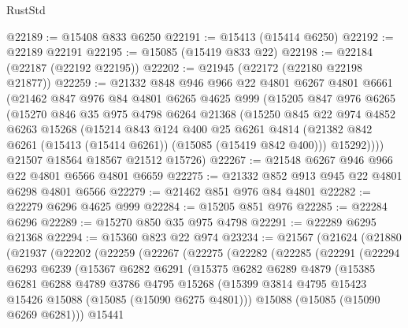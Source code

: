 \begin{lexlean}{RustStd}
\begin{coremodule}
@22189 := @15408 @833 @6250
@22191 := @15413 (@15414 @6250)
@22192 := @22189 @22191
@22195 := @15085 (@15419 @833 @22)
@22198 := @22184 (@22187 (@22192 @22195))
@22202 := @21945 (@22172 (@22180 @22198 @21877))
@22259 := @21332
    @848
    @946
    @966
    @22
    @4801
    @6267
    @4801
    @6661
    (@21462
      @847
      @976
      @84
      @4801
      @6265
      @4625
      @999
      (@15205
        @847
        @976
        @6265
        (@15270
          @846
          @35
          @975
          @4798
          @6264
          @21368
          (@15250
            @845
            @22
            @974
            @4852
            @6263
            @15268
            (@15214
              @843
              @124
              @400
              @25
              @6261
              @4814
              (@21382 @842 @6261 (@15413 (@15414 @6261)) (@15085 (@15419 @842 @400)))
              @15292))))
      @21507
      @18564
      @18567
      @21512
      @15726)
@22267 := @21548 @6267 @946 @966 @22 @4801 @6566 @4801 @6659
@22275 := @21332 @852 @913 @945 @22 @4801 @6298 @4801 @6566
@22279 := @21462 @851 @976 @84 @4801
@22282 := @22279 @6296 @4625 @999
@22284 := @15205 @851 @976
@22285 := @22284 @6296
@22289 := @15270 @850 @35 @975 @4798
@22291 := @22289 @6295 @21368
@22294 := @15360 @823 @22 @974
@23234 := @21567
    (@21624
      (@21880
        (@21937
          (@22202
            (@22259
              (@22267
                (@22275
                  (@22282
                    (@22285
                      (@22291
                        (@22294
                          @6293
                          @6239
                          (@15367
                            @6282
                            @6291
                            (@15375
                              @6282
                              @6289
                              @4879
                              (@15385
                                @6281
                                @6288
                                @4789
                                @3786
                                @4795
                                @15268
                                (@15399
                                  @3814
                                  @4795
                                  @15423
                                  @15426
                                  @15088
                                  (@15085 (@15090 @6275 @4801)))
                                @15088
                                (@15085 (@15090 @6269 @6281)))
                              @15441

\end{coremodule}
\end{lexlean}
